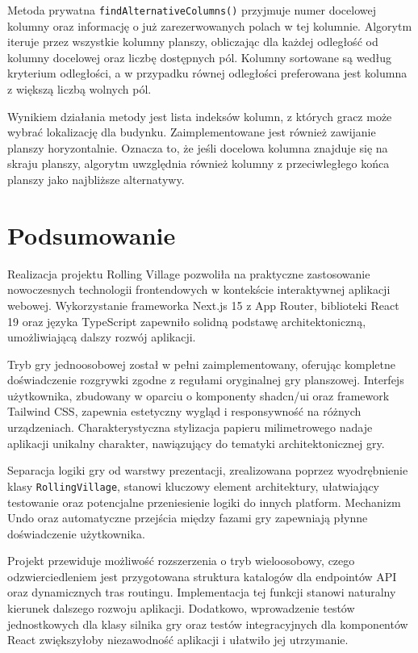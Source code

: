 \documentclass[12pt, a4paper]{article}
\begin{document}
Metoda prywatna \texttt{findAlternativeColumns()} przyjmuje numer docelowej kolumny oraz informację o już zarezerwowanych polach w tej kolumnie. Algorytm iteruje przez wszystkie kolumny planszy, obliczając dla każdej odległość od kolumny docelowej oraz liczbę dostępnych pól. Kolumny sortowane są według kryterium odległości, a w przypadku równej odległości preferowana jest kolumna z większą liczbą wolnych pól.

Wynikiem działania metody jest lista indeksów kolumn, z których gracz może wybrać lokalizację dla budynku. Zaimplementowane jest również zawijanie planszy horyzontalnie. Oznacza to, że jeśli docelowa kolumna znajduje się na skraju planszy, algorytm uwzględnia również kolumny z przeciwległego końca planszy jako najbliższe alternatywy.

\section{Podsumowanie}

Realizacja projektu Rolling Village pozwoliła na praktyczne zastosowanie nowoczesnych technologii frontendowych w kontekście interaktywnej aplikacji webowej. Wykorzystanie frameworka Next.js 15 z App Router, biblioteki React 19 oraz języka TypeScript zapewniło solidną podstawę architektoniczną, umożliwiającą dalszy rozwój aplikacji.

Tryb gry jednoosobowej został w pełni zaimplementowany, oferując kompletne doświadczenie rozgrywki zgodne z regułami oryginalnej gry planszowej. Interfejs użytkownika, zbudowany w oparciu o komponenty shadcn/ui oraz framework Tailwind CSS, zapewnia estetyczny wygląd i responsywność na różnych urządzeniach. Charakterystyczna stylizacja papieru milimetrowego nadaje aplikacji unikalny charakter, nawiązujący do tematyki architektonicznej gry.

Separacja logiki gry od warstwy prezentacji, zrealizowana poprzez wyodrębnienie klasy \texttt{RollingVillage}, stanowi kluczowy element architektury, ułatwiający testowanie oraz potencjalne przeniesienie logiki do innych platform. Mechanizm Undo oraz automatyczne przejścia między fazami gry zapewniają płynne doświadczenie użytkownika.

Projekt przewiduje możliwość rozszerzenia o tryb wieloosobowy, czego odzwierciedleniem jest przygotowana struktura katalogów dla endpointów API oraz dynamicznych tras routingu. Implementacja tej funkcji stanowi naturalny kierunek dalszego rozwoju aplikacji. Dodatkowo, wprowadzenie testów jednostkowych dla klasy silnika gry oraz testów integracyjnych dla komponentów React zwiększyłoby niezawodność aplikacji i ułatwiło jej utrzymanie.
\end{document}
